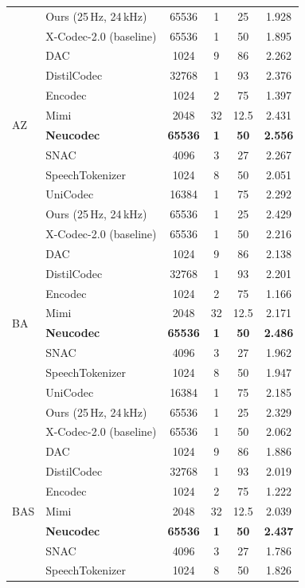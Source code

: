 \documentclass[preprint]{article}
\begin{document}
\begin{longtable}{llcccc}
  & Ours (25\,Hz, 24\,kHz) & 65536 & 1 & 25 & 1.928 \\
  & X-Codec-2.0 (baseline) & 65536 & 1 & 50 & 1.895 \\
\midrule
\multirow{8}{*}{AZ}
  & DAC & 1024 & 9 & 86 & 2.262 \\
  & DistilCodec & 32768 & 1 & 93 & 2.376 \\
  & Encodec & 1024 & 2 & 75 & 1.397 \\
  & Mimi & 2048 & 32 & 12.5 & 2.431 \\
  & \textbf{Neucodec} & \textbf{65536} & \textbf{1} & \textbf{50} & \textbf{2.556} \\
  & SNAC & 4096 & 3 & 27 & 2.267 \\
  & SpeechTokenizer & 1024 & 8 & 50 & 2.051 \\
  & UniCodec & 16384 & 1 & 75 & 2.292 \\
  & Ours (25\,Hz, 24\,kHz) & 65536 & 1 & 25 & 2.429 \\
  & X-Codec-2.0 (baseline) & 65536 & 1 & 50 & 2.216 \\
\midrule
\multirow{8}{*}{BA}
  & DAC & 1024 & 9 & 86 & 2.138 \\
  & DistilCodec & 32768 & 1 & 93 & 2.201 \\
  & Encodec & 1024 & 2 & 75 & 1.166 \\
  & Mimi & 2048 & 32 & 12.5 & 2.171 \\
  & \textbf{Neucodec} & \textbf{65536} & \textbf{1} & \textbf{50} & \textbf{2.486} \\
  & SNAC & 4096 & 3 & 27 & 1.962 \\
  & SpeechTokenizer & 1024 & 8 & 50 & 1.947 \\
  & UniCodec & 16384 & 1 & 75 & 2.185 \\
  & Ours (25\,Hz, 24\,kHz) & 65536 & 1 & 25 & 2.329 \\
  & X-Codec-2.0 (baseline) & 65536 & 1 & 50 & 2.062 \\
\midrule
\multirow{8}{*}{BAS}
  & DAC & 1024 & 9 & 86 & 1.886 \\
  & DistilCodec & 32768 & 1 & 93 & 2.019 \\
  & Encodec & 1024 & 2 & 75 & 1.222 \\
  & Mimi & 2048 & 32 & 12.5 & 2.039 \\
  & \textbf{Neucodec} & \textbf{65536} & \textbf{1} & \textbf{50} & \textbf{2.437} \\
  & SNAC & 4096 & 3 & 27 & 1.786 \\
  & SpeechTokenizer & 1024 & 8 & 50 & 1.826 \\

\end{longtable}
\end{document}
